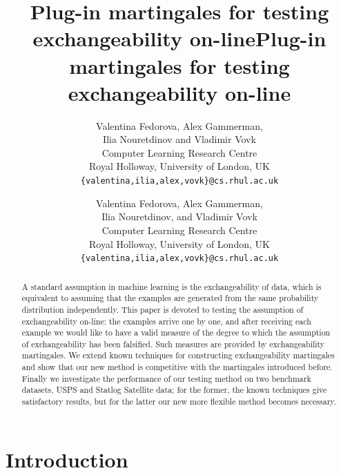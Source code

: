 \documentclass{article}
\title{Plug-in martingales for testing exchangeability on-line}
\author{Valentina Fedorova, Alex Gammerman,\\ Ilia Nouretdinov and Vladimir Vovk\\
  Computer Learning Research Centre\\
  Royal Holloway, University of London, UK\\
  \texttt{\{valentina,ilia,alex,vovk\}@cs.rhul.ac.uk}}
\title{Plug-in martingales for testing exchangeability on-line}
\author{Valentina Fedorova, Alex Gammerman,\\ Ilia Nouretdinov, and Vladimir Vovk\\[3mm]
  Computer Learning Research Centre\\
  Royal Holloway, University of London, UK\\[3mm]
  \texttt{\{valentina,ilia,alex,vovk\}@cs.rhul.ac.uk}}
\theoremstyle{definition}
\begin{document}
\ifCONF
{}
\fi

\ifnotCONF
  \maketitle
\fi

\begin{abstract}
A standard assumption in machine learning is the exchangeability of data,
which is equivalent to assuming that the examples are generated from the same
probability distribution independently. This paper is devoted to testing
the assumption of exchangeability on-line: the examples arrive one by one,
and after receiving each example we would like to have
a valid measure of the degree
to which the assumption of exchangeability has been falsified.
Such measures are provided by exchangeability martingales.
We extend known techniques for constructing exchangeability martingales
and show that our new method is competitive with the martingales introduced before.
Finally we investigate the performance of our
testing method on two benchmark datasets,
USPS and Statlog Satellite data;
for the former, the known techniques give satisfactory results,
but for the latter our new more flexible method becomes necessary. \end{abstract}

\section{Introduction}\label{sec:intro}
\end{document}
